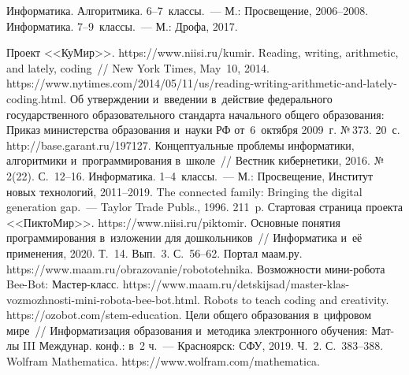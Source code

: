 \begin{multicols}{2}
{{\begin{thebibliography}{99}
  
   Информатика. 
Алгоритмика. 6--7~классы.~--- М.: Просвещение,  
2006--2008. 
   Информатика. 
7--9~классы.~--- М.: Дрофа, 2017. 

  Проект <<КуМир>>. {\sf https://www.niisi.ru/kumir}.
   Reading, writing, arithmetic, and lately, coding~// New York Times, May~10, 2014. 
{\sf https://www.\linebreak nytimes.com/2014/05/11/us/reading-writing-arithmetic-and-lately-coding.html}.
  Об утверждении и~введении в~действие федерального государственного образовательного 
стандарта начального общего образования: Приказ министерства образования и~науки РФ 
от~6~октября 2009~г. №\,373. 20~с. {\sf http://base.garant.ru/197127}.
   Концептуальные проблемы информатики, алгоритмики 
  и~программирования в~школе~// Вестник кибернетики, 2016. №\,2(22). С.~12--16.
   Информатика. 1--4~классы.~--- М.: Просвещение, Институт новых технологий, 2011--2019.
   The connected family: Bringing the digital generation gap.~--- Taylor Trade Publs., 
1996. 211~p.
  Стартовая страница проекта <<ПиктоМир>>. {\sf 
https://www.niisi.ru/piktomir}.
   Основные понятия 
программирования в~изложении для дошкольников~// Информатика и~её применения, 2020. 
Т.~14. Вып.~3. С.~56--62.
  Портал маам.ру. {\sf https://www.maam.ru/obrazovanie/\linebreak robototehnika}.
  Возможности мини-робота Bee-Bot: Мастер-класс. {\sf  
  https://www.maam.ru/detskijsad/master-klas-vozmozhnosti-mini-robota-bee-bot.html}.
  Robots to teach coding and creativity. {\sf https://\linebreak ozobot.com/stem-education}.
   Цели общего образования в~цифровом мире~// Информатизация 
образования и~методика электронного обучения: Мат-лы III Междунар. конф.: в~2 ч.~--- 
Красноярск: СФУ, 2019. Ч.~2. С.~383--388.
  Wolfram Mathematica. {\sf https://www.wolfram.com/\linebreak mathematica}.
\end{thebibliography}

 }
 }

\end{multicols}


